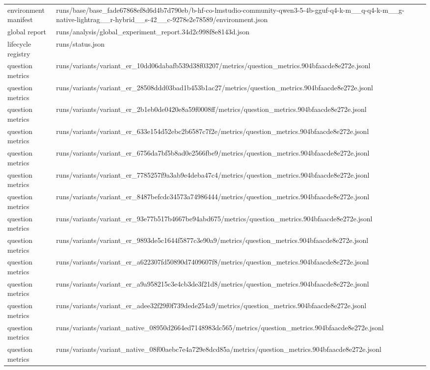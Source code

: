 \begin{tabular}{ll}
environment manifest & runs/base/base_fade67868ef8d6d4b7d790eb/b-hf-co-lmstudio-community-qwen3-5-4b-gguf-q4-k-m__q-q4-k-m__g-native-lightrag__r-hybrid__s-42__c-9278e2e78589/environment.json \\
global report & runs/analysis/global_experiment_report.34d2c998f8e8143d.json \\
lifecycle registry & runs/status.json \\
question metrics & runs/variants/variant_er_10dd06dabafb539d38f03207/metrics/question_metrics.904bfaacde8e272e.jsonl \\
question metrics & runs/variants/variant_er_28508ddd03bad1b453b1ac27/metrics/question_metrics.904bfaacde8e272e.jsonl \\
question metrics & runs/variants/variant_er_2b1eb0de0420e8a59f0008ff/metrics/question_metrics.904bfaacde8e272e.jsonl \\
question metrics & runs/variants/variant_er_633e154d52ebc2b6587c7f2e/metrics/question_metrics.904bfaacde8e272e.jsonl \\
question metrics & runs/variants/variant_er_6756da7bf5b8ad0e2566fbe9/metrics/question_metrics.904bfaacde8e272e.jsonl \\
question metrics & runs/variants/variant_er_7785257f9a3ab9e4deba47c4/metrics/question_metrics.904bfaacde8e272e.jsonl \\
question metrics & runs/variants/variant_er_8487befcdc34573a74986444/metrics/question_metrics.904bfaacde8e272e.jsonl \\
question metrics & runs/variants/variant_er_93e77b517b4667be94abd675/metrics/question_metrics.904bfaacde8e272e.jsonl \\
question metrics & runs/variants/variant_er_9893de5c1644f5877c3e90a9/metrics/question_metrics.904bfaacde8e272e.jsonl \\
question metrics & runs/variants/variant_er_a622307fd50890d7409607f8/metrics/question_metrics.904bfaacde8e272e.jsonl \\
question metrics & runs/variants/variant_er_a9a958215c3e4cb3de3f21d8/metrics/question_metrics.904bfaacde8e272e.jsonl \\
question metrics & runs/variants/variant_er_adee32f29f0f739dede254a9/metrics/question_metrics.904bfaacde8e272e.jsonl \\
question metrics & runs/variants/variant_native_08950d2664ed7148983dc565/metrics/question_metrics.904bfaacde8e272e.jsonl \\
question metrics & runs/variants/variant_native_08f00aebc7e4a729e8dcd85a/metrics/question_metrics.904bfaacde8e272e.jsonl \\

\end{tabular}
